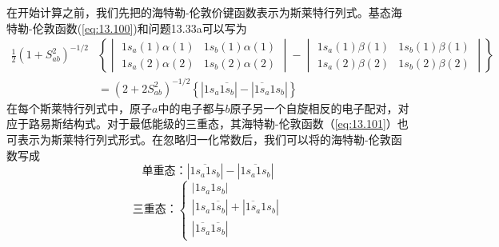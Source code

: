     在开始计算之前，我们先把的海特勒-伦敦价键函数表示为斯莱特行列式。基态海特勒-伦敦函数(\ref{eq:13.100})和问题13.33a可以写为
    \begin{equation}
        \begin{aligned}
            \frac{1}{2}\left(1 + S_{ab}^2\right)^{-1/2} & \left\{ \begin{vmatrix}
                1s_a\left(1\right)\alpha\left(1\right) & 1s_b\left(1\right)\alpha\left(1\right) \\
                1s_a\left(2\right)\alpha\left(2\right) & 1s_b\left(2\right)\alpha\left(2\right)
            \end{vmatrix} - \begin{vmatrix}
                1s_a\left(1\right)\beta\left(1\right) & 1s_b\left(1\right)\beta\left(1\right) \\
                1s_a\left(2\right)\beta\left(2\right) & 1s_b\left(2\right)\beta\left(2\right)
            \end{vmatrix} \right\} \\
            & = \left(2 + 2S_{ab}^2\right)^{-1/2}\left\{\left|1s_a\overline{1s_b}\right| - \left|\overline{1s_a}1s_b\right|\right\}
        \end{aligned}
        \label{eq:13.114}
    \end{equation}
    在每个斯莱特行列式中，原子$a$中的电子都与$b$原子另一个自旋相反的电子配对，对应于路易斯结构式。对于最低能级的三重态，其海特勒-伦敦函数（\ref{eq:13.101}）也可表示为斯莱特行列式形式。在忽略归一化常数后，我们可以将的海特勒-伦敦函数写成
    \begin{equation}
        \text{单重态：}\left| \overline{1s_a 1s_b} \right| - \left| \overline{1s_a 1s_b} \right|
        \label{eq:13.115}
    \end{equation}
    \begin{equation}
        \text{三重态：}\left\{ \begin{array}{l}
            \left| 1s_a 1s_b \right| \\
            \left| 1s_a \overline{1s_b} \right| + \left| \overline{1s_a} 1s_b \right| \\
            \left| \overline{1s_a} \overline{1s_b} \right|
            \end{array} \right.
        \label{eq:13.116}
    \end{equation}

